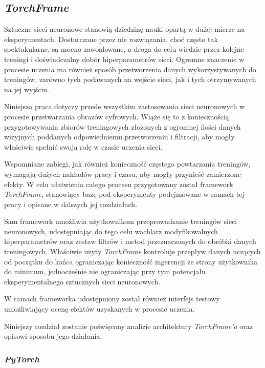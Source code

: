 \subsection[\textit{TorchFrame} (Piotr Winkler)]{\textit{TorchFrame}}
\label{TorchFrame}

  Sztuczne sieci neuronowe stanowią dziedzinę nauki opartą w dużej mierze na
  eksperymentach. Dostarczane przez nie rozwiązania, choć często tak spektakularne,
  są mocno zawoalowane, a droga do celu wiedzie przez kolejne treningi
  i doświadczalny dobór hiperparametrów sieci. Ogromne znaczenie w procesie uczenia
  ma również sposób przetworzenia danych wykorzystywanych do treningów, zarówno
  tych podawanych na wejście sieci, jak i tych otrzymywanych na jej wyjściu.

  Niniejsza praca dotyczy przede wszystkim zastosowania sieci neuronowych w
  procesie przetwarzania obrazów cyfrowych. Wiąże się to z koniecznością przygotowywania
  zbiorów treningowych złożonych z ogromnej ilości danych wizyjnych poddanych
  odpowiedniemu przetworzeniu i filtracji, aby mogły właściwie spełnić swoją rolę
  w czasie uczenia sieci.

  Wspomniane zabiegi, jak również konieczność częstego powtarzania treningów,
  wymagają dużych nakładów pracy i czasu, aby mogły przynieść zamierzone efekty.
  W celu ułatwienia całego procesu przygotowany został framework \textit{TorchFrame},
  stanowiący bazę pod eksperymenty podejmowane w ramach tej pracy i opisane w
  dalszych jej rozdziałach.

  Sam framework umożliwia użytkownikom przeprowadzanie treningów sieci neuronowych,
  udostępniając do tego celu wachlarz modyfikowalnych hiperparametrów oraz zestaw filtrów i metod
  przeznaczonych do obróbki danych treningowych. Właściwie użyty \textit{TorchFrame} kontroluje
  przepływ danych uczących od początku do końca ograniczając konieczność ingerencji ze
  strony użytkownika do minimum, jednocześnie nie ograniczając przy tym potencjału
  eksperymentalnego sztucznych sieci neuronowych.

  W ramach frameworka udostępniony został również interfejs testowy
  umożliwiający ocenę efektów uzyskanych w procesie uczenia.

  Niniejszy rozdział zostanie poświęcony analizie architektury \textit{TorchFrame'a} oraz
  opisowi sposobu jego działania.

  \subsubsection{\textit{PyTorch}}

